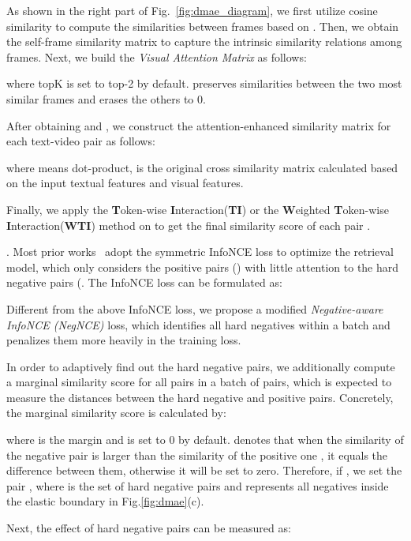 \documentclass[sigconf]{acmart}
\begin{document}
As shown in the right part of Fig.~\ref{fig:dmae_diagram}, we first utilize cosine similarity to compute the similarities between frames based on . Then, we obtain the self-frame similarity matrix  to capture the intrinsic similarity relations among frames. 
Next, we build the \textit{Visual Attention Matrix } as follows:

where topK is set to top-2 by default.  preserves similarities between the two most similar frames and erases the others to 0.


After obtaining  and , we construct the attention-enhanced similarity matrix  for each text-video pair  as follows:

where   means dot-product,  is the original cross similarity matrix calculated based on the input textual features and visual features.

Finally, we apply the \textbf{T}oken-wise \textbf{I}nteraction(\textbf{TI}) or the \textbf{W}eighted \textbf{T}oken-wise \textbf{I}nteraction(\textbf{WTI}) method \cite{drl2022} on  to get the final similarity score  of each pair .



. 
Most prior works~\cite{clip2021,ts2net2022,xclip2022,drl2022} adopt the symmetric InfoNCE loss to optimize the retrieval model, which only considers the positive pairs () with little attention to the hard negative pairs (. The InfoNCE loss can be formulated as:  


Different from the above InfoNCE loss, we propose a modified \textit{Negative-aware InfoNCE (NegNCE)} loss, {which identifies all hard negatives within a batch and penalizes them more heavily in the training loss.}




In order to adaptively find out the hard negative pairs, we additionally compute a marginal similarity score  for all pairs  in a batch of  pairs, which is expected to measure the distances between the hard negative and positive pairs. Concretely, the marginal similarity score is calculated by: 

where  is the margin and is set to 0 by default.  denotes that when the similarity of the negative pair  is larger than the similarity of the positive one , it equals the difference between them, otherwise it will be set to zero.
Therefore, if , we set the pair , where  is the set of hard negative pairs and represents all negatives inside the elastic boundary in Fig.\ref{fig:dmae}(c).

Next, the effect of hard negative pairs can be measured as:
\end{document}
